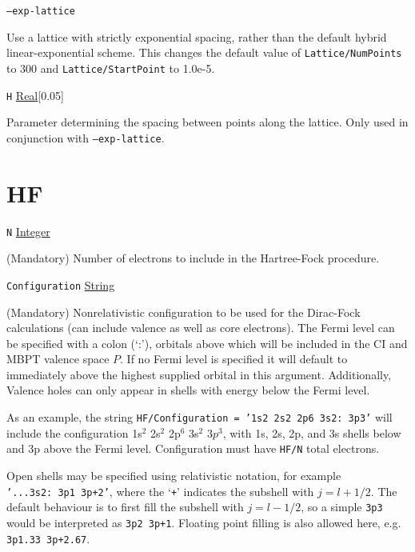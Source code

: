 \documentclass{report}
\begin{document}
\texttt{--exp-lattice}
\begin{adjustwidth}{1cm}{}
Use a lattice with strictly exponential spacing, rather than the default hybrid linear-exponential
scheme. This changes the default value of \texttt{Lattice/NumPoints} to 300 and
\texttt{Lattice/StartPoint} to 1.0e-5.
\end{adjustwidth}

\texttt{H} \uline{Real}[0.05]
\begin{adjustwidth}{1cm}{}
Parameter determining the spacing between points along the lattice. Only used in conjunction with
\texttt{--exp-lattice}.
\end{adjustwidth}

\section{HF}

\texttt{N} \uline{Integer}
\begin{adjustwidth}{1cm}{}
(Mandatory) Number of electrons to include in the Hartree-Fock procedure.
\end{adjustwidth}
\texttt{Configuration} \uline{String} 
\begin{adjustwidth}{1cm}{}
(Mandatory) Nonrelativistic configuration to be used for the
Dirac-Fock calculations (can include valence as well as core electrons). The Fermi level can be specified
with a colon (`:'), orbitals above which will be included in the CI and MBPT valence space $P$. If no
Fermi level is specified it will default to immediately above the highest supplied orbital in this
argument. Additionally, Valence holes can only appear in shells with energy below the Fermi level.
                                                                               
As an example, the string \texttt{HF/Configuration = '1s2 2s2 2p6 3s2:~3p3'} will include the configuration
1s$^2$ 2s$^2$ 2p$^6$ 3s$^2$ $3p^3$, with 1s, 2s, 2p, and 3s shells below and 3p above the Fermi level.
Configuration must have \texttt{HF/N} total electrons.

Open shells may be specified using relativistic notation, for example \texttt{'...3s2:~3p1 3p+2'}, where the `\texttt{+}' indicates the subshell with $j = l+1/2$. The default behaviour is to first fill the subshell with $j = l-1/2$, so a simple \texttt{3p3} would be interpreted as \texttt{3p2 3p+1}. Floating point filling is also allowed here, e.g. \texttt{3p1.33 3p+2.67}.
\end{adjustwidth}
\end{document}
